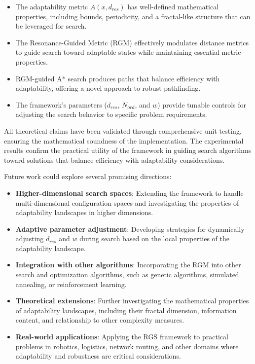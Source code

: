 \documentclass{article}
\begin{document}
\begin{itemize}
    \item The adaptability metric $A(x, d_{res})$ has well-defined mathematical properties, including bounds, periodicity, and a fractal-like structure that can be leveraged for search.
    \item The Resonance-Guided Metric (RGM) effectively modulates distance metrics to guide search toward adaptable states while maintaining essential metric properties.
    \item RGM-guided A* search produces paths that balance efficiency with adaptability, offering a novel approach to robust pathfinding.
    \item The framework's parameters ($d_{res}$, $N_{ord}$, and $w$) provide tunable controls for adjusting the search behavior to specific problem requirements.
\end{itemize}

All theoretical claims have been validated through comprehensive unit testing, ensuring the mathematical soundness of the implementation. The experimental results confirm the practical utility of the framework in guiding search algorithms toward solutions that balance efficiency with adaptability considerations.

Future work could explore several promising directions:
\begin{itemize}
    \item \textbf{Higher-dimensional search spaces}: Extending the framework to handle multi-dimensional configuration spaces and investigating the properties of adaptability landscapes in higher dimensions.
    \item \textbf{Adaptive parameter adjustment}: Developing strategies for dynamically adjusting $d_{res}$ and $w$ during search based on the local properties of the adaptability landscape.
    \item \textbf{Integration with other algorithms}: Incorporating the RGM into other search and optimization algorithms, such as genetic algorithms, simulated annealing, or reinforcement learning.
    \item \textbf{Theoretical extensions}: Further investigating the mathematical properties of adaptability landscapes, including their fractal dimension, information content, and relationship to other complexity measures.
    \item \textbf{Real-world applications}: Applying the RGS framework to practical problems in robotics, logistics, network routing, and other domains where adaptability and robustness are critical considerations.
\end{itemize}
\end{document}
